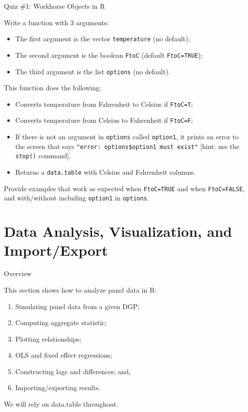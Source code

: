 \documentclass[10pt,ignorenonframetext,]{beamer}
\providecommand{\tightlist}{%
\setlength{\itemsep}{0pt}\setlength{\parskip}{0pt}}
\begin{document}
\begin{frame}[fragile]{Quiz \#1: Workhorse Objects in R}

Write a function with 3 arguments:

\begin{itemize}
\tightlist
\item
  The first argument is the vector \texttt{temperature} (no default);
\item
  The second argument is the boolean \texttt{FtoC} (default
  \texttt{FtoC=TRUE});
\item
  The third argument is the list \texttt{options} (no default).
\end{itemize}

This function does the following:

\begin{itemize}
\tightlist
\item
  Converts temperature from Fahrenheit to Celsius if \texttt{FtoC=T};
\item
  Converts temperature from Celsius to Fahrenheit if \texttt{FtoC=F};
\item
  If there is not an argument in \texttt{options} called
  \texttt{option1}, it prints an error to the screen that says
  \texttt{"error:\ options\$option1\ must\ exist"} {[}hint: use the
  \texttt{stop()} command{]}.
\item
  Returns a \texttt{data.table} with Celsius and Fahrenheit columns.
\end{itemize}

Provide examples that work as expected when \texttt{FtoC=TRUE} and when
\texttt{FtoC=FALSE}, and with/without including \texttt{option1} in
\texttt{options}.

\end{frame}

\section{Data Analysis, Visualization, and
Import/Export}\label{data-analysis-visualization-and-importexport}

\begin{frame}{Overview}

This section shows how to analyze panel data in R:

\begin{enumerate}
\def\labelenumi{\arabic{enumi}.}
\tightlist
\item
  Simulating panel data from a given DGP;
\item
  Computing aggregate statistic;
\item
  Plotting relationships;
\item
  OLS and fixed effect regressions;
\item
  Constructing lags and differences; and,
\item
  Importing/exporting results.
\end{enumerate}

We will rely on data.table throughout.

\end{frame}
\end{document}

